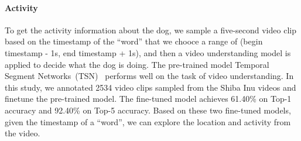 \paragraph{Activity} To get the activity information about the dog, we sample a five-second video clip based on the timestamp of the ``word'' that we chooce a range of (begin timestamp  - 1s, end timestamp + 1s), and then a video understanding model is applied to decide what the dog is doing. The pre-trained model Temporal Segment Networks~(TSN)~\cite{wang2018temporal} performs well on the task of video understanding. In this study, we annotated 2534 video clips sampled from the Shiba Inu videos and finetune the pre-trained model. The fine-tuned model achieves 61.40\% on Top-1 accuracy and 92.40\% on Top-5 accuracy. Based on these two fine-tuned models, given the timestamp of a ``word'', we can explore the location and activity from the video.


